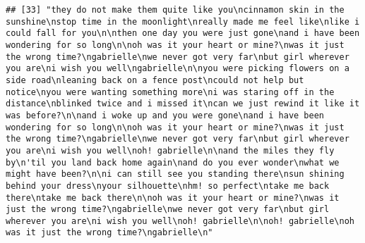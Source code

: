 \documentclass[]{article}
\begin{document}
\begin{verbatim}
## [33] "they do not make them quite like you\ncinnamon skin in the sunshine\nstop time in the moonlight\nreally made me feel like\nlike i could fall for you\n\nthen one day you were just gone\nand i have been wondering for so long\n\noh was it your heart or mine?\nwas it just the wrong time?\ngabrielle\nwe never got very far\nbut girl wherever you are\ni wish you well\ngabrielle\n\nyou were picking flowers on a side road\nleaning back on a fence post\ncould not help but notice\nyou were wanting something more\ni was staring off in the distance\nblinked twice and i missed it\ncan we just rewind it like it was before?\n\nand i woke up and you were gone\nand i have been wondering for so long\n\noh was it your heart or mine?\nwas it just the wrong time?\ngabrielle\nwe never got very far\nbut girl wherever you are\ni wish you well\noh! gabrielle\n\nand the miles they fly by\n'til you land back home again\nand do you ever wonder\nwhat we might have been?\n\ni can still see you standing there\nsun shining behind your dress\nyour silhouette\nhm! so perfect\ntake me back there\ntake me back there\n\noh was it your heart or mine?\nwas it just the wrong time?\ngabrielle\nwe never got very far\nbut girl wherever you are\ni wish you well\noh! gabrielle\n\noh! gabrielle\noh was it just the wrong time?\ngabrielle\n"                                                                                                                                                                                                                                                                                                                                                                                                                                                                                                                                                                                                                                                                                                                                                                                                                                                                                                                                                                                                                                                                                                                                                                                                                                                                                                                                                                                                                                                                                                                                                                                                                

\end{verbatim}
\end{document}
